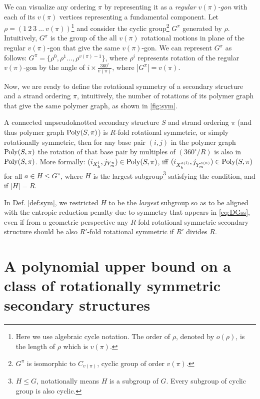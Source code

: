 We can visualize any ordering $\pi$ by representing it as a \emph{regular $v(\pi)$-gon} with each of its $v(\pi)$ vertices   representing a fundamental component. %
Let $\rho = (1 \ 2 \ 3 \ ... \ v(\pi))$\footnote{Here we use algebraic cycle notation.  
	The order of $\rho$, denoted by $o(\rho)$, is the length of $\rho$ which is $v(\pi)$.} and consider the cyclic group\footnote{$G^\pi$ is isomorphic to $C_{v(\pi)}$, cyclic group of order $v(\pi)$.} $G^\pi$ generated by $\rho$. Intuitively, $G^\pi$ is the group of the all $v(\pi)$ rotational motions in plane of the regular $v(\pi)$-gon that give the same $v(\pi)$-gon. 
We can represent  $G^\pi$ as follows:  $G^\pi = \{\rho^0, \rho^1 ...,\rho^{v(\pi)-1}\}$, where $\rho^i$ represents rotation of the regular $v(\pi)$-gon by the angle of  
$i \times {\frac{360^{\circ}}{v(\pi)}}$, 
where  $|G^\pi| = v(\pi)$.


Now, we are ready to define the rotational symmetry of a secondary structure and a strand ordering $\pi$, intuitively, the number of rotations of its polymer graph that give the same polymer graph, as shown in \cref{fig:sym}.


\begin{Definition}  \label{def:sym}
	A connected unpseudoknotted secondary structure $S$ and strand ordering $\pi$ 
	(and thus polymer graph $\mathrm{Poly}(S,\pi)$) 
	is $R$-fold rotational symmetric, 
	or simply rotationally symmetric, 
	then for any base pair $(i,j)$ in the polymer graph $\mathrm{Poly}(S,\pi)$
	the rotation of that base pair by multiples of $(360^\circ/R)$ is also in $\mathrm{Poly}(S,\pi)$. 
	More formally:   
	$(i_{X_k^l},j_{Y_m^n}) \in \mathrm{Poly}(S,\pi)$,   
	iff 
	$(i_{X_k^{a(l)}}, j_{Y_m^{a(n)}}) \in \mathrm{Poly}(S,\pi)$ for all $a \in H \! \leq \! G^\pi$, where $H$ is the largest subgroup\footnote{$H \leq G$, notationally means $H$ is a subgroup of $G$. Every subgroup of cyclic group is also cyclic.} satisfying the condition, and if $|H| = R$.  
\end{Definition}


\begin{remark}
	In Def. \ref{def:sym},	we restricted $H$ to be the {\em largest} subgroup so as to be aligned with the entropic reduction penalty due to symmetry that appears in \cref{eq:DGss}, even if  from a geometric perspective any $R$-fold rotational symmetric secondary structure should be also $R'$-fold rotational symmetric if $R'$ divides $R$. 
\end{remark}


\section{A polynomial upper bound on a class of rotationally symmetric secondary structures}\label{sec:ub}


